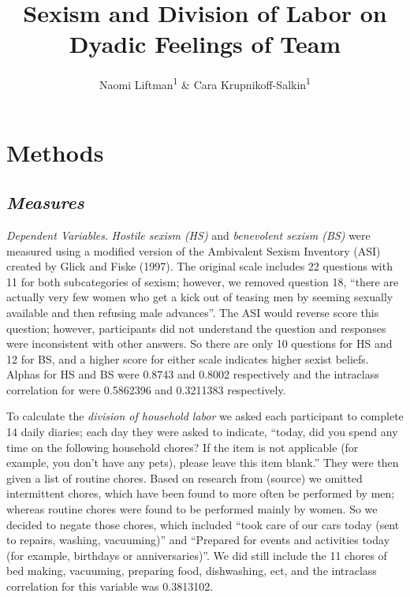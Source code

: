 \documentclass[
  english,
  man]{apa6}
\title{Sexism and Division of Labor on Dyadic Feelings of Team}
\author{Naomi Liftman\textsuperscript{1} \& Cara Krupnikoff-Salkin\textsuperscript{1}}
\date{}
\affiliation{\vspace{0.5cm}\textsuperscript{1} Smith College}
\begin{document}
\maketitle

\hypertarget{methods}{%
\section{Methods}\label{methods}}

\hypertarget{measures}{%
\subsection{\texorpdfstring{\emph{Measures}}{Measures}}\label{measures}}

\emph{Dependent Variables}. \emph{Hostile sexism (HS)} and \emph{benevolent sexism (BS)} were measured using a modified version of the Ambivalent Sexism Inventory (ASI) created by Glick and Fiske (1997). The original scale includes 22 questions with 11 for both subcategories of sexism; however, we removed question 18, \enquote{there are actually very few women who get a kick out of teasing men by seeming sexually available and then refusing male advances}. The ASI would reverse score this question; however, participants did not understand the question and responses were inconsistent with other answers. So there are only 10 questions for HS and 12 for BS, and a higher score for either scale indicates higher sexist beliefs. Alphas for HS and BS were 0.8743 and 0.8002 respectively and the intraclass correlation for were 0.5862396 and 0.3211383 respectively.

To calculate the \emph{division of household labor} we asked each participant to complete 14 daily diaries; each day they were asked to indicate, \enquote{today, did you spend any time on the following household chores? If the item is not applicable (for example, you don't have any pets), please leave this item blank.} They were then given a list of routine chores. Based on research from (source) we omitted intermittent chores, which have been found to more often be performed by men; whereas routine chores were found to be performed mainly by women. So we decided to negate those chores, which included \enquote{took care of our cars today (sent to repairs, washing, vacuuming)} and \enquote{Prepared for events and activities today (for example, birthdays or anniversaries)}. We did still include the 11 chores of bed making, vacuuming, preparing food, dishwashing, ect, and the intraclass correlation for this variable was 0.3813102.
\end{document}
